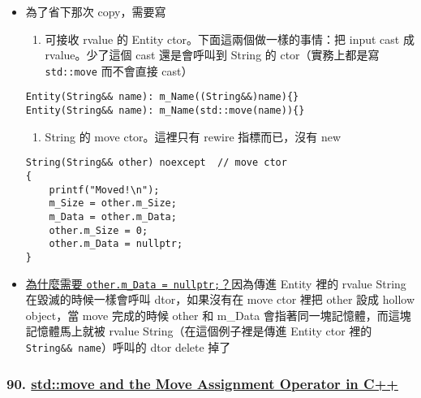 \documentclass[11pt]{article}
\providecommand{\tightlist}{%
      \setlength{\itemsep}{0pt}\setlength{\parskip}{0pt}}
\begin{document}
\begin{itemize}
\tightlist
\item
  為了省下那次 copy，需要寫

  \begin{enumerate}
  \def\labelenumi{\arabic{enumi}.}
  \tightlist
  \item
    可接收 rvalue 的 Entity ctor。下面這兩個做一樣的事情：把 input cast
    成 rvalue。少了這個 cast 還是會呼叫到 String 的 ctor（實務上都是寫
    \texttt{std::move} 而不會直接 cast）
  \end{enumerate}

\begin{verbatim}
Entity(String&& name): m_Name((String&&)name){}
Entity(String&& name): m_Name(std::move(name)){}
\end{verbatim}

  \begin{enumerate}
  \def\labelenumi{\arabic{enumi}.}
  \setcounter{enumi}{1}
  \tightlist
  \item
    String 的 move ctor。這裡只有 rewire 指標而已，沒有 new
  \end{enumerate}

\begin{verbatim}
String(String&& other) noexcept  // move ctor
{
    printf("Moved!\n");
    m_Size = other.m_Size;
    m_Data = other.m_Data;
    other.m_Size = 0;
    other.m_Data = nullptr;
}
\end{verbatim}
\item
  \href{https://youtu.be/ehMg6zvXuMY?list=PLlrATfBNZ98dudnM48yfGUldqGD0S4FFb\&t=600}{為什麼需要
  \texttt{other.m\_Data\ =\ nullptr;}？}因為傳進 Entity 裡的 rvalue
  String 在毀滅的時候一樣會呼叫 dtor，如果沒有在 move ctor 裡把 other
  設成 hollow object，當 move 完成的時候 other 和 m\_Data
  會指著同一塊記憶體，而這塊記憶體馬上就被 rvalue
  String（在這個例子裡是傳進 Entity ctor 裡的
  \texttt{String\&\&\ name}）呼叫的 dtor delete 掉了
\end{itemize}

\hypertarget{stdmove-and-the-move-assignment-operator-in-c}{%
\subsubsection{\texorpdfstring{90.
\href{https://youtu.be/OWNeCTd7yQE?list=PLlrATfBNZ98dudnM48yfGUldqGD0S4FFb\&t=146}{std::move
and the Move Assignment Operator in
C++}}{90. std::move and the Move Assignment Operator in C++}}\label{stdmove-and-the-move-assignment-operator-in-c}}
\end{document}
